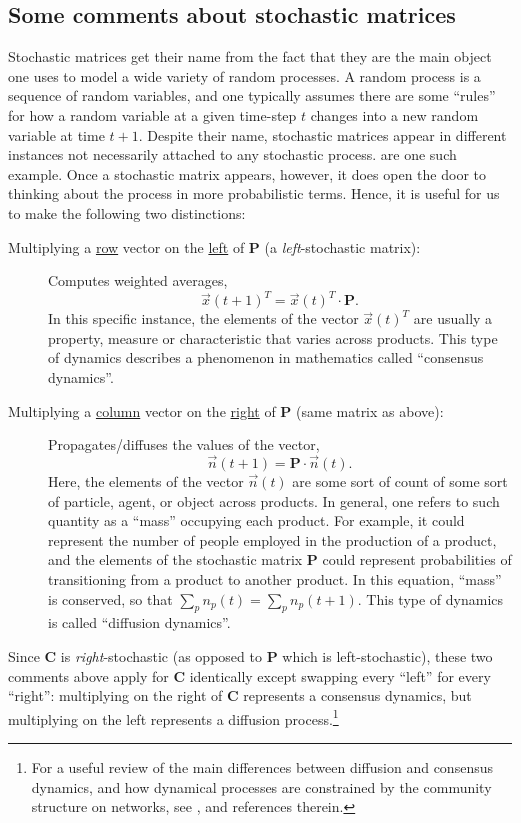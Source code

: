 \documentclass[12pt]{article}
\newcommand{\mtx}[1]{\mathbf{ #1}}
\begin{document}
\subsection{Some comments about stochastic matrices}
Stochastic matrices get their name from the fact that they are the main object one uses to model a wide variety of random processes. A random process is a sequence of random variables, and one typically assumes there are some ``rules'' for how a random variable at a given time-step $t$ changes into a new random variable at time $t+1$. Despite their name, stochastic matrices appear in different instances not necessarily attached to any stochastic process.  are one such example. Once a stochastic matrix appears, however, it does open the door to thinking about the process in more probabilistic terms. Hence, it is useful for us to make the following two distinctions:
\begin{description}
	\item[Multiplying a \underline{row} vector on the \underline{left} of $\mtx{P}$ (a \emph{left}-stochastic matrix):] 
	Computes weighted averages, $$\vec{x}(t+1)^T = \vec{x}(t)^T\cdot\mtx{P}.$$
	In this specific instance, the elements of the vector $\vec{x}(t)^T$ are usually a property, measure or characteristic that varies across products. This type of dynamics describes a phenomenon in mathematics called ``consensus dynamics''.
	\item[Multiplying a \underline{column} vector on the \underline{right} of $\mtx{P}$ (same matrix as above):] 
	Propagates/diffuses the values of the vector, $$\vec{n}(t+1) = \mtx{P}\cdot\vec{n}(t).$$
	Here, the elements of the vector $\vec{n}(t)$ are some sort of count of some sort of particle, agent, or object across products. In general, one refers to such quantity as a ``mass'' occupying each product. For example, it could represent the number of people employed in the production of a product, and the elements of the stochastic matrix $\mtx{P}$ could represent probabilities of transitioning from a product to another product. In this equation, ``mass'' is conserved, so that $\sum_p n_p(t) = \sum_p n_p(t+1)$. This type of dynamics is called ``diffusion dynamics''.
\end{description}
Since $\mtx{C}$ is \emph{right}-stochastic (as opposed to $\mtx{P}$ which is left-stochastic), these two comments above apply for $\mtx{C}$ identically except swapping every ``left'' for every ``right'': multiplying on the right of $\mtx{C}$ represents a consensus dynamics, but multiplying on the left represents a diffusion process.\footnote{For a useful review of the main differences between diffusion and consensus dynamics, and how dynamical processes are constrained by the community structure on networks, see \citet{schaub2018structured}, and references therein.}
\end{document}
